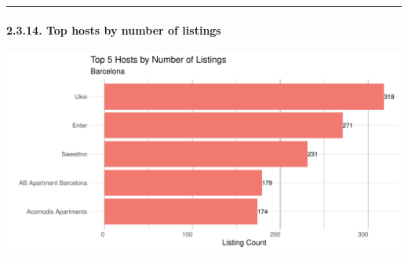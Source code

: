 \documentclass[
]{article}
\begin{document}
\begin{center}\rule{0.5\linewidth}{0.5pt}\end{center}

\hypertarget{top-hosts-by-number-of-listings}{%
\paragraph{2.3.14. Top hosts by number of
listings}\label{top-hosts-by-number-of-listings}}

\begin{center}\includegraphics{Barcelona-AirBnB-Insights_files/figure-latex/plot14-1} \end{center}
\end{document}
